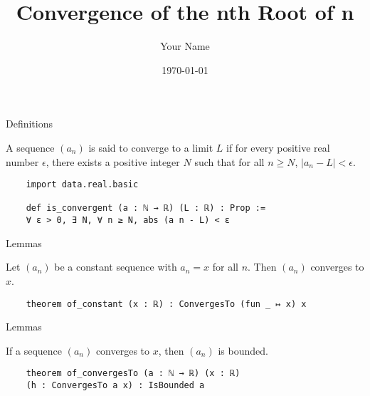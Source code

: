 \documentclass{beamer}
\title{Convergence of the nth Root of n}
\author{Your Name}
\date{\today}
\begin{document}
\begin{frame}
    \titlepage
\end{frame}

\begin{frame}[fragile]{Definitions}
    \begin{definition}
    A sequence $(a_n)$ is said to converge to a limit $L$ if for every positive real number $\epsilon$, there exists a positive integer $N$ such that for all $n \geq N$, $|a_n - L| < \epsilon$.
    \end{definition}

    \begin{lstlisting}
    import data.real.basic

    def is_convergent (a : ℕ → ℝ) (L : ℝ) : Prop :=
    ∀ ε > 0, ∃ N, ∀ n ≥ N, abs (a n - L) < ε
    \end{lstlisting}

\end{frame}

\begin{frame}[fragile]{Lemmas}
    \begin{lemma} 
        Let $(a_n)$ be a constant sequence with $a_n = x$ for all $n$. Then $(a_n)$ converges to $x$.
    \end{lemma}

    \begin{definition}
    \begin{lstlisting}
    theorem of_constant (x : ℝ) : ConvergesTo (fun _ ↦ x) x
    \end{lstlisting}
    \end{definition}
\end{frame}

\begin{frame}[fragile]{Lemmas}
    \begin{lemma}
        If a sequence $(a_n)$ converges to $x$, then $(a_n)$ is bounded.
    \end{lemma}

    \begin{lemma}
    \begin{lstlisting}
    theorem of_convergesTo (a : ℕ → ℝ) (x : ℝ) 
    (h : ConvergesTo a x) : IsBounded a 
    \end{lstlisting}
    \end{lemma}
\end{frame}
\end{document}
